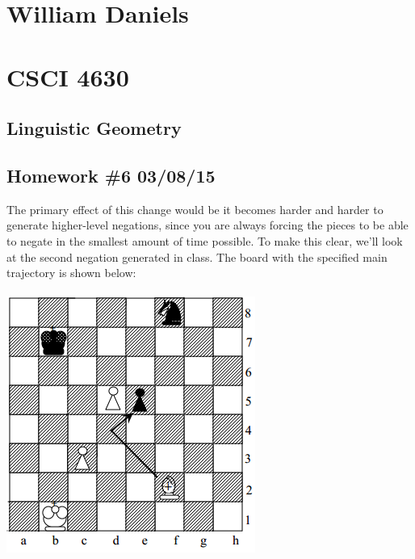 \documentclass[11pt]{article}
\begin{document}
\begin{center}
\section*{William Daniels}
\section*{CSCI 4630}
\subsection*{Linguistic Geometry}
\subsection*{Homework \#6 03/08/15}
\end{center}

\vspace{.25cm}

The primary effect of this change would be it becomes harder and harder to generate higher-level negations, since you are always forcing the pieces to be able to negate in the smallest amount of time possible. To make this clear, we'll look at the second negation generated in class. The board with the specified main trajectory is shown below: \\\\
\includegraphics{2ndNegation.png}\\\\
\end{document}
